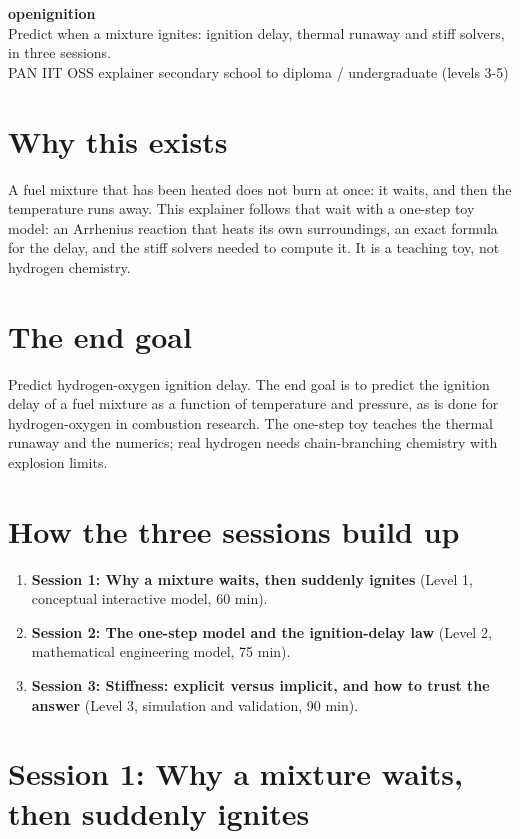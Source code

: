 \documentclass[11pt,a4paper]{article}
\begin{document}
\begin{center}{\LARGE\bfseries openignition}\\[0.4em]{\large Predict when a mixture ignites: ignition delay, thermal runaway and stiff solvers, in three sessions.}\\[0.2em]\small PAN IIT OSS explainer \textbullet{} secondary school to diploma / undergraduate (levels 3-5)\end{center}

\section*{Why this exists}
A fuel mixture that has been heated does not burn at once: it waits, and then the temperature runs away. This explainer follows that wait with a one-step toy model: an Arrhenius reaction that heats its own surroundings, an exact formula for the delay, and the stiff solvers needed to compute it. It is a teaching toy, not hydrogen chemistry.

\section*{The end goal}
Predict hydrogen-oxygen ignition delay. The end goal is to predict the ignition delay of a fuel mixture as a function of temperature and pressure, as is done for hydrogen-oxygen in combustion research. The one-step toy teaches the thermal runaway and the numerics; real hydrogen needs chain-branching chemistry with explosion limits.

\section*{How the three sessions build up}
\begin{enumerate}[nosep]
\item \textbf{Session 1: Why a mixture waits, then suddenly ignites} (Level 1, conceptual interactive model, 60 min).
\item \textbf{Session 2: The one-step model and the ignition-delay law} (Level 2, mathematical engineering model, 75 min).
\item \textbf{Session 3: Stiffness: explicit versus implicit, and how to trust the answer} (Level 3, simulation and validation, 90 min).
\end{enumerate}

\section{Session 1: Why a mixture waits, then suddenly ignites}
\end{document}
